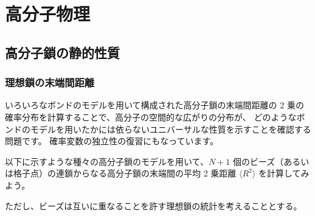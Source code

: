 \documentclass[uplatex,dvipdfmx,a4paper,11pt]{jsarticle}
\begin{document}
\section{高分子物理}

\subsection{高分子鎖の静的性質}

\subsubsection{理想鎖の末端間距離}

\begin{boxnote}
いろいろなボンドのモデルを用いて構成された高分子鎖の末端間距離の 2 乗の確率分布を計算することで、高分子の空間的な広がりの分布が、
どのようなボンドのモデルを用いたかには依らないユニバーサルな性質を示すことを確認する問題です。
確率変数の独立性の復習にもなっています。
\end{boxnote}

\vspace{10pt}

以下に示すような種々の高分子鎖のモデルを用いて、$N+1$ 個のビーズ（あるいは格子点）の連鎖からなる高分子鎖の末端間の平均 2 乗距離 $\langle R^2 \rangle$ を計算してみよう。

ただし、ビーズは互いに重なることを許す理想鎖の統計を考えることとする。


\end{document}
